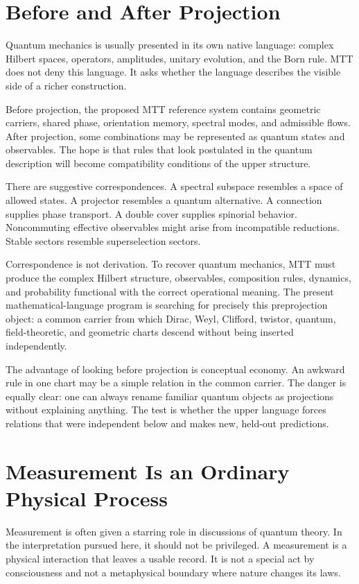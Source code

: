 \documentclass[11pt,openany]{book}
\begin{document}
\chapter{Before and After Projection}

Quantum mechanics is usually presented in its own native language: complex
Hilbert spaces, operators, amplitudes, unitary evolution, and the Born rule.
MTT does not deny this language. It asks whether the language describes the
visible side of a richer construction.

Before projection, the proposed MTT reference system contains geometric
carriers, shared phase, orientation memory, spectral modes, and admissible
flows. After projection, some combinations may be represented as quantum
states and observables. The hope is that rules that look postulated in the
quantum description will become compatibility conditions of the upper
structure.

There are suggestive correspondences. A spectral subspace resembles a space
of allowed states. A projector resembles a quantum alternative. A connection
supplies phase transport. A double cover supplies spinorial behavior.
Noncommuting effective observables might arise from incompatible reductions.
Stable sectors resemble superselection sectors.

Correspondence is not derivation. To recover quantum mechanics, MTT must
produce the complex Hilbert structure, observables, composition rules,
dynamics, and probability functional with the correct operational meaning.
The present mathematical-language program is searching for precisely this
preprojection object: a common carrier from which Dirac, Weyl, Clifford,
twistor, quantum, field-theoretic, and geometric charts descend without being
inserted independently.

The advantage of looking before projection is conceptual economy. An awkward
rule in one chart may be a simple relation in the common carrier. The danger
is equally clear: one can always rename familiar quantum objects as
projections without explaining anything. The test is whether the upper
language forces relations that were independent below and makes new,
held-out predictions.

\chapter{Measurement Is an Ordinary Physical Process}

Measurement is often given a starring role in discussions of quantum theory.
In the interpretation pursued here, it should not be privileged. A
measurement is a physical interaction that leaves a usable record. It is not
a special act by consciousness and not a metaphysical boundary where nature
changes its laws.
\end{document}

